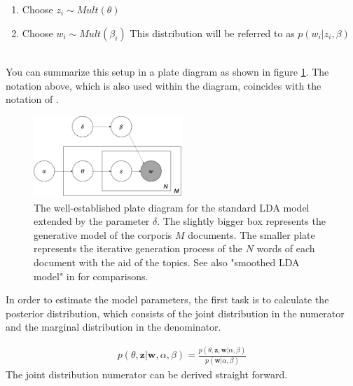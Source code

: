 \documentclass[11pt,a4paper]{article}
\begin{document}
\begin{enumerate}
	\item Choose $z_i \sim Mult(\theta)$
	
	\item Choose $w_i \sim Mult(\beta_i)$ This distribution will be referred to as $p(w_i|z_i,\beta)$
\end{enumerate}
\ \\
You can summarize this setup in a plate diagram as shown in figure \ref{fig:PlateDiagram}. The notation above, which is also used within the diagram, coincides with the notation of \cite{Hornik2011}.\\


\begin{figure}[h]
	\centering
	\includegraphics[width=0.5\textwidth]{LDA_Plate_Diagram.png}
	\caption{The well-established plate diagram for the standard LDA model extended by the parameter $\delta$. The slightly bigger box represents the generative model of the corporis $M$ documents. The smaller plate represents the iterative generation process of the $N$ words of each document with the aid of the topics. See also "smoothed LDA model" in \cite{Blei2003}  for comparisons.}
	\label{fig:PlateDiagram}
\end{figure}

In order to estimate the model parameters, the first task is to calculate the posterior distribution, which consists of the joint distribution in the numerator and the marginal distribution in the denominator.

\begin{align}\label{posterior}
	p(\theta,\textbf{z}|\textbf{w},\alpha,\beta)= \frac{p(\theta,\textbf{z},\textbf{w}|\alpha,\beta)}
	{p(\textbf{w}|\alpha, \beta)}
\end{align}
The joint distribution numerator can be derived straight forward.
\end{document}

